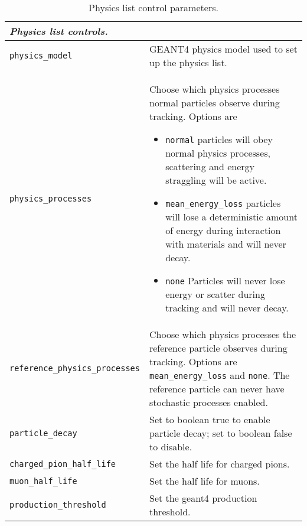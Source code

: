 \begin{table*}
\begin{center}
\caption{Physics list control parameters.}
\begin{tabularx}{\textwidth}{lX}
\hline
\multicolumn{2}{l}{\emph{Physics list controls.}} \\
\hline
\verb|physics_model| & GEANT4 physics model used to set up the physics list.\\
\verb|physics_processes| & Choose which physics processes normal particles observe during tracking. Options are 
                            \begin{itemize}
                            \item \verb|normal| particles will obey normal physics processes, scattering and energy straggling will be active.
                            \item \verb|mean_energy_loss| particles will lose a deterministic amount of energy during interaction with materials and will never decay.
                            \item \verb|none| Particles will never lose energy or scatter during tracking and will never decay.
                            \end{itemize} \\
\verb|reference_physics_processes| & Choose which physics processes the reference particle observes during tracking. Options are \verb|mean_energy_loss| and \verb|none|. The reference particle can never have stochastic processes enabled.\\
\verb|particle_decay| & Set to boolean true to enable particle decay; set to boolean false to disable.\\
\verb|charged_pion_half_life| & Set the half life for charged pions.\\
\verb|muon_half_life| & Set the half life for muons.\\
\verb|production_threshold| & Set the geant4 production threshold.\\
\end{tabularx}
\end{center}
\end{table*}

